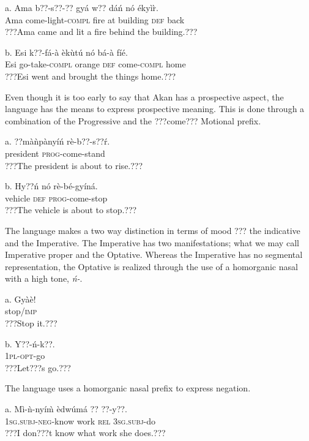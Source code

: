 \documentclass[output=paper]{langsci/langscibook}
\begin{document}
\ea
\gll a.  Ama  b??-s??-??      gyá  w??  dáń    nó  ékyì\`{r}.\\
       Ama  come-light-\textsc{compl}  fire  at  building  \textsc{def}  back\\
\glt   ???Ama came and lit a fire behind the building.???
\z

\ea
\gll  b.  Esi  k??-fá-à      èk\`{u}tú    nó  bá-à    fíé.\\
       Esi  go-take-\textsc{compl}  orange    \textsc{def}  come-\textsc{compl}  home\\
\glt   ???Esi went and brought the things home.???
\z

Even though it is too early to say that Akan has a prospective aspect, the language has the means to express prospective meaning. This is done through a combination of the Progressive and the ???come??? Motional prefix.

\ea
\gll a.  ??màǹpànyíń  rè-b??-s??\'{r}.\\
       president  \textsc{prog}{}-come-stand\\
\glt   ???The president is about to rise.???
\z

\ea
\gll  b.  Hy??ń    nó  rè-bé-gyíná.\\
       vehicle    \textsc{def}  \textsc{prog}{}-come-stop\\
\glt   ???The vehicle is about to stop.???
\z

The language makes a two way distinction in terms of mood ??? the indicative and the Imperative. The Imperative has two manifestations; what we may call Imperative proper and the Optative. Whereas the Imperative has no segmental representation, the Optative is realized through the use of a homorganic nasal with a high tone, \emph{ń-}. 

\ea
\gll a.  Gyàè!\\
       stop/\textsc{imp}\\
\glt   ???Stop it.???
\z


\ea
\gll  b.  Y??-ń-k??.\\
       \textsc{1pl}{}-\textsc{opt}{}-go\\
\glt   ???Let???s go.???
\z

The language uses a homorganic nasal prefix to express negation.


\ea
\gll a.  Mì-ǹ-nyí\`{m}     èdwúmá  ??   ??{}-y??.\\
       \textsc{1sg.subj}{}-\textsc{neg}{}-know  work    \textsc{rel}  \textsc{3sg.subj}{}-do\\
\glt   ???I don???t know what work she does.???
\z
\end{document}
